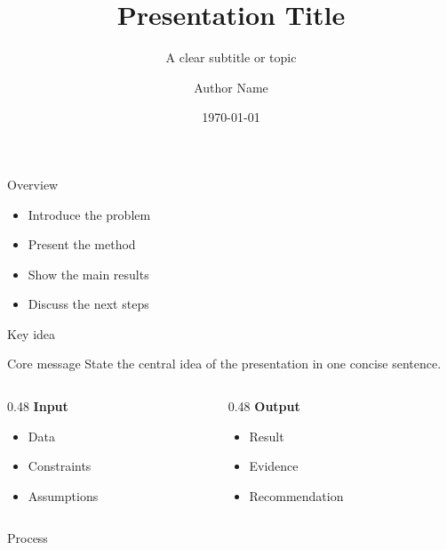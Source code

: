 \documentclass[11pt,aspectratio=169]{beamer}
\title{Presentation Title}
\subtitle{A clear subtitle or topic}
\author{Author Name}
\institute{Organisation Name}
\date{\today}
\begin{document}
\begin{frame}
\titlepage
\end{frame}

\begin{frame}{Overview}
\begin{itemize}
    \item Introduce the problem
    \item Present the method
    \item Show the main results
    \item Discuss the next steps
\end{itemize}
\end{frame}

\begin{frame}{Key idea}
\begin{block}{Core message}
    State the central idea of the presentation in one concise sentence.
\end{block}

\vspace{4mm}
\begin{columns}[t]
\begin{column}{0.48\textwidth}
\textbf{\textcolor{LrssnPrimaryText}{Input}}
\begin{itemize}
    \item Data
    \item Constraints
    \item Assumptions
\end{itemize}
\end{column}
\begin{column}{0.48\textwidth}
\textbf{\textcolor{LrssnSecondaryText}{Output}}
\begin{itemize}
    \item Result
    \item Evidence
    \item Recommendation
\end{itemize}
\end{column}
\end{columns}
\end{frame}

\begin{frame}{Process}
\begin{center}
\end{center}
\end{frame}
\end{document}

